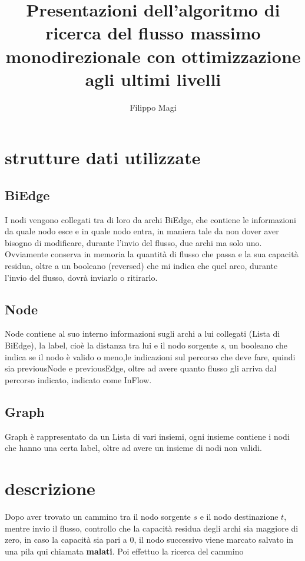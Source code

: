 \documentclass{article}
\title{Presentazioni dell'algoritmo di ricerca del flusso massimo monodirezionale con ottimizzazione agli ultimi livelli  }
\author{Filippo Magi }
\begin{document}
\maketitle

\section{strutture dati utilizzate}
\subsection{BiEdge}
I nodi vengono collegati tra di loro da archi BiEdge, che contiene le informazioni da quale nodo esce e in quale nodo entra, in maniera tale da non dover aver bisogno di modificare, durante l'invio del flusso, due archi ma solo uno.
Ovviamente conserva in memoria la quantità di flusso che passa e la sua capacità residua, oltre a un booleano (reversed) che mi indica che quel arco, durante l'invio del flusso, dovrà inviarlo o ritirarlo.
\subsection{Node}
Node contiene al suo interno informazioni sugli archi a lui collegati (Lista di BiEdge), la label, cioè la distanza tra lui e il nodo sorgente \textit{s}, un booleano che indica se il nodo è valido o meno,le indicazioni sul percorso che deve fare, quindi sia previousNode e previousEdge, oltre ad avere quanto flusso gli arriva dal percorso indicato, indicato come InFlow.
\subsection{Graph}
Graph è rappresentato da un Lista di vari insiemi, ogni insieme contiene i nodi che hanno una certa label, oltre ad avere un insieme di nodi non validi.
\section{descrizione}

Dopo aver trovato un cammino tra il nodo sorgente $s$ e il nodo destinazione $t$, mentre invio il flusso, controllo che la capacità residua degli archi sia maggiore
di zero, in caso la capacità sia pari a 0, il nodo successivo viene marcato salvato in una pila qui chiamata \textbf{malati}.
Poi effettuo la ricerca del cammino
\end{document}
